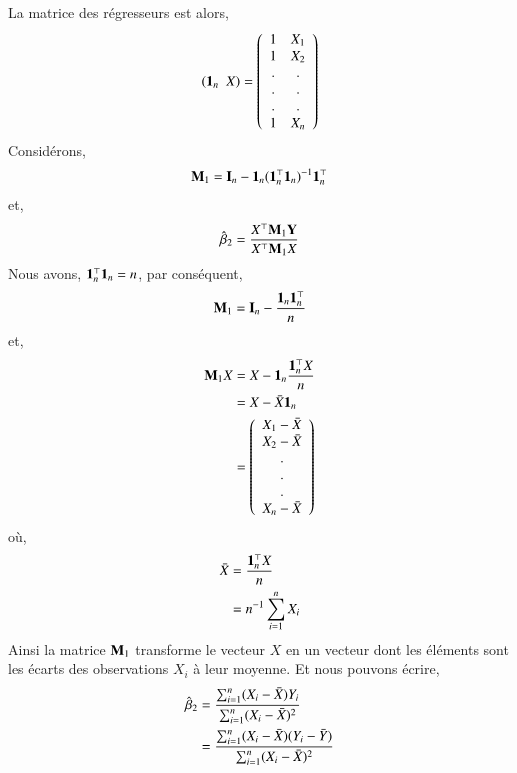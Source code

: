 \documentclass[10pt, reqno]{amsart}
\begin{document}
La matrice des régresseurs est alors,
\begin{align*}
 \left(\mathbf{1}_n \ \ X\right) = 
\left(
\begin{array}{cc}
1&X_1\\
1&X_2\\
.&.\\
.&.\\
.&.\\
1&X_n
\end{array}
\right)
\end{align*}
Considérons,
\begin{align*}
\mathbf M_1 = \mathbf{I}_n - \mathbf{1}_n(\mathbf{1}_n^\top\mathbf{1}_n)^{-1}\mathbf{1}_n^\top
\end{align*}
et,
\begin{align*}
\hat{\beta}_2 = \frac{X^\top\mathbf M_1\mathbf Y}{X^\top\mathbf M_1X}
\end{align*}
Nous avons, $\mathbf{1}_n^\top\mathbf{1}_n = n$, par conséquent,
\begin{align*}
\mathbf M_1 = \mathbf{I}_n - \frac{\mathbf{1}_n\mathbf{1}_n^\top}{n}
\end{align*}
et,
\begin{align*}
\mathbf M_1X &= X - \mathbf{1}_n\frac{\mathbf{1}_n^\top X}{n}\\
& = X - \bar{X}\mathbf{1}_n\\
& = 
\left(
\begin{array}{c}
X_1 - \bar{X}\\
X_2 - \bar{X}\\
.\\
.\\
.\\
X_n - \bar{X}
\end{array}
\right)
\end{align*}
où,
\begin{align*}
\bar{X} &= \frac{\mathbf{1}_n^\top X}{n}\\
&=n^{-1}\sum_{i=1}^n X_i
\end{align*}
Ainsi la matrice $\mathbf M_1$ transforme le vecteur $X$ en un vecteur dont les éléments sont les écarts des observations $X_i$ à leur moyenne. Et nous pouvons écrire,
\begin{align*}
\hat{\beta}_2 &= \frac{\sum_{i=1}^n(X_i - \bar{X})Y_i}{\sum_{i=1}^n(X_i - \bar{X}) ^2}\\
&= \frac{\sum_{i=1}^n(X_i - \bar{X})(Y_i - \bar{Y})}{\sum_{i=1}^n(X_i - \bar{X}) ^2}
\end{align*}
\end{document}
